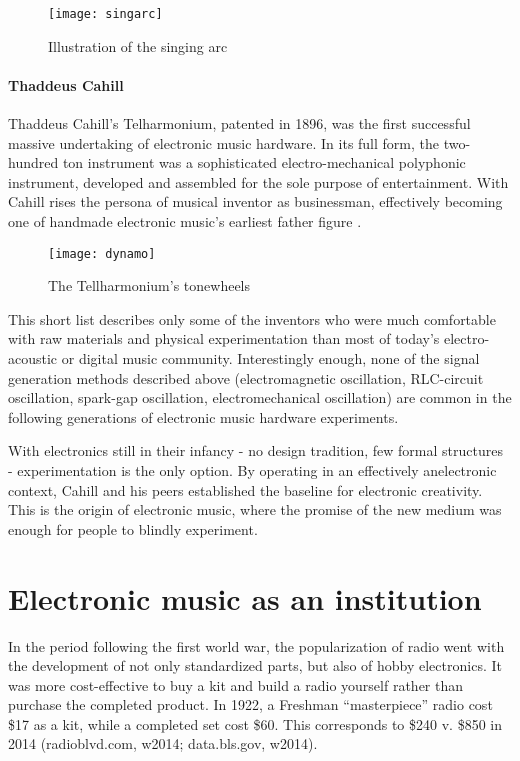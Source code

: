 	\begin{figure}[h!]
	  \caption{Illustration of the singing arc}
	  \centering
	    \texttt{[image: singarc]}
	\end{figure}

\paragraph{Thaddeus Cahill}

	Thaddeus Cahill’s Telharmonium, patented in 1896, was the first successful massive undertaking of electronic music hardware. In its full form, the two-hundred ton instrument was a sophisticated electro-mechanical polyphonic instrument, developed and assembled for the sole purpose of entertainment. With Cahill rises the persona of musical inventor as businessman, effectively becoming one of handmade electronic music’s earliest father figure \cite{holmes2002}. 
	
	\begin{figure}[h!]
	  \caption{The Tellharmonium's tonewheels}
	  \centering
	    \texttt{[image: dynamo]}
	\end{figure}

	This short list describes only some of the inventors who were much comfortable with raw materials and physical experimentation than most of today’s electro-acoustic or digital music community. Interestingly enough, none of the signal generation methods described above (electromagnetic oscillation, RLC-circuit oscillation, spark-gap oscillation, electromechanical oscillation) are common in the following generations of electronic music hardware experiments. 

	With electronics still in their infancy - no design tradition, few formal structures -  experimentation is the only option. By operating in an effectively anelectronic context, Cahill and his peers established the baseline for electronic creativity. This is the origin of electronic music, where the promise of the new medium was enough for people to blindly experiment. 

\section{Electronic music as an institution}

In the period following the first world war, the popularization of radio went with the development of not only standardized parts, but also of hobby electronics. It was more cost-effective to buy a kit and build a radio yourself rather than purchase the completed product. In 1922, a Freshman “masterpiece” radio cost \$17 as a kit, while a completed set cost \$60. This corresponds to \$240 v. \$850 in 2014 (radioblvd.com, w2014; data.bls.gov, w2014). 

